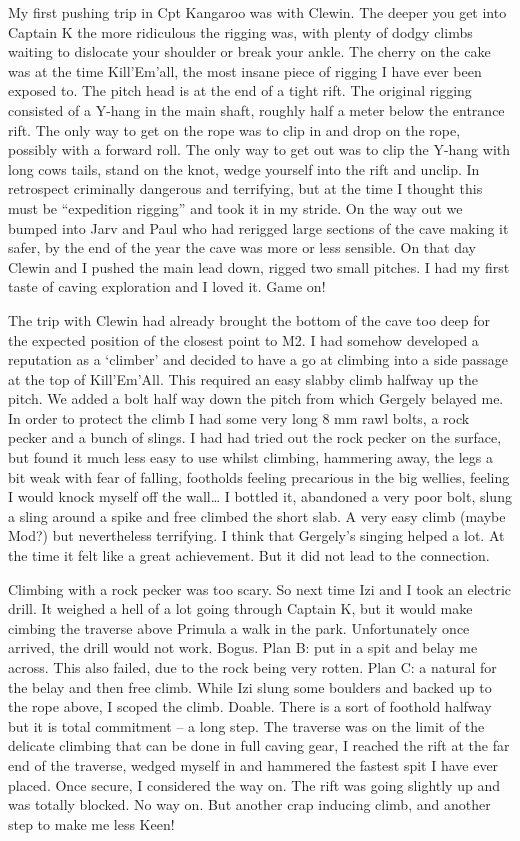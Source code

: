 My first pushing trip in Cpt Kangaroo was with Clewin. The deeper you
get into Captain K the more ridiculous the rigging was, with plenty of
dodgy climbs waiting to dislocate your shoulder or break your ankle. The
cherry on the cake was at the time Kill'Em'all, the most insane piece of
rigging I have ever been exposed to. The pitch head is at the end of a
tight rift. The original rigging consisted of a Y-hang in the main
shaft, roughly half a meter below the entrance rift. The only way to get
on the rope was to clip in and drop on the rope, possibly with a forward
roll. The only way to get out was to clip the Y-hang with long cows
tails, stand on the knot, wedge yourself into the rift and unclip. In
retrospect criminally dangerous and terrifying, but at the time I
thought this must be ``expedition rigging'' and took it in my stride. On
the way out we bumped into Jarv and Paul who had rerigged large sections
of the cave making it safer, by the end of the year the cave was more or
less sensible. On that day Clewin and I pushed the main lead down,
rigged two small pitches. I had my first taste of caving exploration and
I loved it. Game on!

The trip with Clewin had already brought the bottom of the cave too deep
for the expected position of the closest point to M2. I had somehow
developed a reputation as a `climber' and decided to have a go at
climbing into a side passage at the top of Kill'Em'All. This required an
easy slabby climb halfway up the pitch. We added a bolt half way down
the pitch from which Gergely belayed me. In order to protect the climb I
had some very long 8 mm rawl bolts, a rock pecker and a bunch of slings.
I had had tried out the rock pecker on the surface, but found it much
less easy to use whilst climbing, hammering away, the legs a bit weak
with fear of falling, footholds feeling precarious in the big wellies,
feeling I would knock myself off the wall\ldots{} I bottled it,
abandoned a very poor bolt, slung a sling around a spike and free
climbed the short slab. A very easy climb (maybe Mod?) but nevertheless
terrifying. I think that Gergely's singing helped a lot. At the time it
felt like a great achievement. But it did not lead to the connection.

Climbing with a rock pecker was too scary. So next time Izi and I took
an electric drill. It weighed a hell of a lot going through Captain K,
but it would make cimbing the traverse above Primula a walk in the park.
Unfortunately once arrived, the drill would not work. Bogus. Plan B: put
in a spit and belay me across. This also failed, due to the rock being
very rotten. Plan C: a natural for the belay and then free climb. While
Izi slung some boulders and backed up to the rope above, I scoped the
climb. Doable. There is a sort of foothold halfway but it is total
commitment -- a long step. The traverse was on the limit of the delicate
climbing that can be done in full caving gear, I reached the rift at the
far end of the traverse, wedged myself in and hammered the fastest spit
I have ever placed. Once secure, I considered the way on. The rift was
going slightly up and was totally blocked. No way on. But another crap
inducing climb, and another step to make me less Keen!

